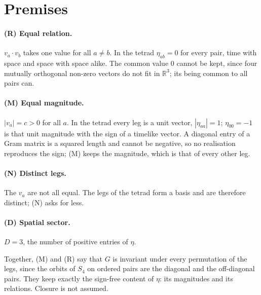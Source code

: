 \documentclass[twocolumn]{iopjournal}
\begin{document}

\section*{Premises}

\paragraph{(R) Equal relation.} $v_a \cdot v_b$ takes one value for
all $a \neq b$. In the tetrad $\eta_{ab} = 0$ for every pair, time
with space and space with space alike. The common value $0$ cannot
be kept, since four mutually orthogonal non-zero vectors do not fit
in $\mathbb{R}^3$; its being common to all pairs can.

\paragraph{(M) Equal magnitude.} $|v_a| = c > 0$ for all $a$. In
the tetrad every leg is a unit vector, $|\eta_{aa}| = 1$;
$\eta_{00} = -1$ is that unit magnitude with the sign of a timelike
vector. A diagonal entry of a Gram matrix is a squared length and
cannot be negative, so no realisation reproduces the sign; (M) keeps
the magnitude, which is that of every other leg.

\paragraph{(N) Distinct legs.} The $v_a$ are not all equal. The legs
of the tetrad form a basis and are therefore distinct; (N) asks for
less.

\paragraph{(D) Spatial sector.} $D = 3$, the number of positive
entries of $\eta$.

\medskip
\noindent
Together, (M) and (R) say that $G$ is invariant under every
permutation of the legs, since the orbits of $S_4$ on ordered pairs
are the diagonal and the off-diagonal pairs. They keep exactly the
sign-free content of $\eta$: its magnitudes and its relations.
Closure is not assumed.

\end{document}
